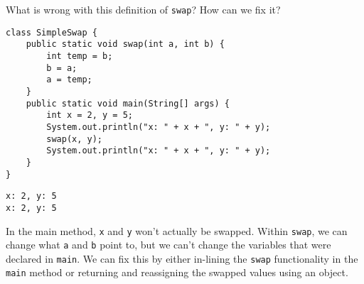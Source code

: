 \question What is wrong with this definition of \texttt{swap}? How can we fix it?

\begin{lstlisting}
class SimpleSwap {
    public static void swap(int a, int b) {
        int temp = b;
        b = a;
        a = temp;
    }
    public static void main(String[] args) {
        int x = 2, y = 5;
        System.out.println("x: " + x + ", y: " + y);
        swap(x, y);
        System.out.println("x: " + x + ", y: " + y);
    }
}
\end{lstlisting}

\begin{solution}
\begin{verbatim}
x: 2, y: 5
x: 2, y: 5
\end{verbatim}
In the main method, \texttt{x} and \texttt{y} won't actually be swapped.
Within \texttt{swap}, we can change what \texttt{a} and \texttt{b} point to, but we can't change the variables that were declared in \texttt{main}. We can fix this by either in-lining the \texttt{swap} functionality in the \texttt{main} method or returning and reassigning the swapped values using an object.
\end{solution}
